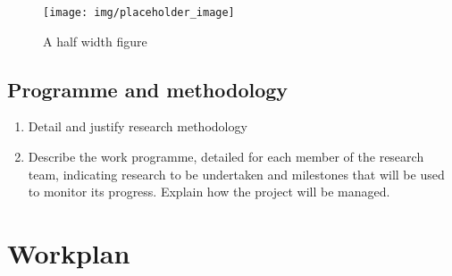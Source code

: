 \documentclass{epsrc}
\begin{document}
\begin{wrapfigure}{r}{0.5\textwidth}
\vspace{-11pt}
	\begin{center}
		\texttt{[image: img/placeholder\_image]}
			\vspace{-30pt}
		\caption{A half width figure}
		\label{fig:half}
	\end{center}
\end{wrapfigure}

\subsection{Programme and methodology}

\begin{enumerate}[label=\bfseries Objective \arabic*:, align=left]
	\item Detail and justify research methodology
	\item Describe the work programme, detailed for each member of the research team, indicating research to be undertaken and milestones that will be used to monitor its progress. Explain how the project will be managed.\end{enumerate}


\clearpage
\section{Workplan}
\end{document}
